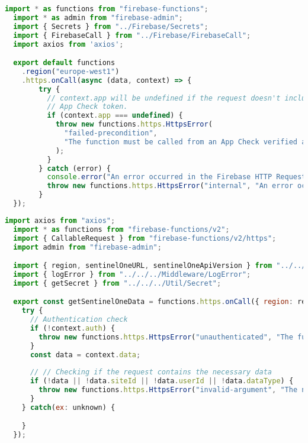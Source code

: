 \begin{lstlisting}[language=JavaScript, caption={An example of Firebase HTTP Request onCall Cloud Function version 1.0}]
  import * as functions from "firebase-functions";
  import * as admin from "firebase-admin";
  import { Secrets } from "../Firebase/Secrets";
  import { FirebaseCall } from "../Firebase/FirebaseCall";
  import axios from 'axios'; 

  export default functions
    .region("europe-west1")
    .https.onCall(async (data, context) => {
        try {
          // context.app will be undefined if the request doesn't include a valid
          // App Check token.
          if (context.app === undefined) {
            throw new functions.https.HttpsError(
              "failed-precondition",
              "The function must be called from an App Check verified app."
            );
          } 
        } catch (error) {
          console.error("An error occurred in the Firebase HTTP Request onCall Cloud Function: ", error);
          throw new functions.https.HttpsError("internal", "An error occurred while processing the request.");
        }
  });
\end{lstlisting}

\begin{lstlisting}[language=JavaScript, caption={onCall Cloud Function version 2.0, where the parameters of the function is less and the way it handles the authorization is different}]
  import axios from "axios";
  import * as functions from "firebase-functions/v2";
  import { CallableRequest } from "firebase-functions/v2/https";
  import admin from "firebase-admin";

  import { region, sentinelOneURL, sentinelOneApiVersion } from "../../../config";
  import { logError } from "../../../Middleware/LogError";
  import { getSecret } from "../../../Util/Secret";

  export const getSentinelOneData = functions.https.onCall({ region: region }, async (context: CallableRequest<any>) => {
    try {
      // Authentication check
      if (!context.auth) {
        throw new functions.https.HttpsError("unauthenticated", "The function must be called while authenticated.");
      }
      const data = context.data;
  
      // // Checking if the request contains the necessary data
      if (!data || !data.siteId || !data.userId || !data.dataType) {
        throw new functions.https.HttpsError("invalid-argument", "The necessary requirement(s) are missing or invalid in your request.");
      }  
    } catch(ex: unknown) {

    }
  });
\end{lstlisting}

